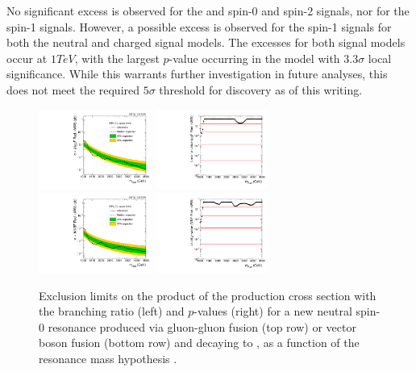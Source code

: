 No significant excess is observed for the \ggF and \VBF spin-0 and spin-2 signals, nor for the \DY spin-1 signals.
However, a possible excess is observed for the \VBF spin-1 signals for both the neutral and charged signal models.
The excesses for both signal models occur at $1\unit{TeV}$, with the largest $p$-value occurring in the \VBF\ZprtoWW model with $3.3\sigma$ local significance.
While this warrants further investigation in future analyses, this does not meet the required $5\sigma$ threshold for discovery as of this writing.

\begin{figure}[htbp]
  \centering
  \includegraphics[width=0.33\textwidth]{fig/results/limits_RadToWW.pdf}
  \includegraphics[width=0.33\textwidth]{fig/results/pvalue_RadToWW.pdf}\\
  \includegraphics[width=0.33\textwidth]{fig/results/limits_VBFRadToWW.pdf}
  \includegraphics[width=0.33\textwidth]{fig/results/pvalue_VBFRadToWW.pdf}
  \caption{
    Exclusion limits on the product of the production cross section with the branching ratio (left) and $p$-values (right) for a new neutral spin-0 resonance produced via gluon-gluon fusion (top row) or vector boson fusion (bottom row) and decaying to \WW, as a function of the resonance mass hypothesis \MX.
  }
  \label{fig:limits_pvalue_spin0}
\end{figure}

